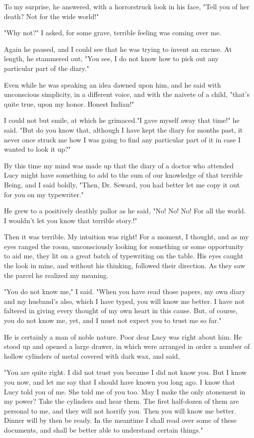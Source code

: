 To my surprise, he answered, with a horrorstruck look in his face, "Tell you of her death? Not for the wide world!" 

"Why not?" I asked, for some grave, terrible feeling was coming over me. 

Again he paused, and I could see that he was trying to invent an excuse. At length, he stammered out, "You see, I do not know how to pick out any particular part of the diary." 

Even while he was speaking an idea dawned upon him, and he said with unconscious simplicity, in a different voice, and with the naivete of a child, "that's quite true, upon my honor. Honest Indian!" 

I could not but smile, at which he grimaced."I gave myself away that time!" he said. "But do you know that, although I have kept the diary for months past, it never once struck me how I was going to find any particular part of it in case I wanted to look it up?" 

By this time my mind was made up that the diary of a doctor who attended Lucy might have something to add to the sum of our knowledge of that terrible Being, and I said boldly, "Then, Dr. Seward, you had better let me copy it out for you on my typewriter." 

He grew to a positively deathly pallor as he said, "No! No! No! For all the world. I wouldn't let you know that terrible story.!" 

Then it was terrible. My intuition was right! For a moment, I thought, and as my eyes ranged the room, unconsciously looking for something or some opportunity to aid me, they lit on a great batch of typewriting on the table. His eyes caught the look in mine, and without his thinking, followed their direction. As they saw the parcel he realized my meaning. 

"You do not know me," I said. "When you have read those papers, my own diary and my husband's also, which I have typed, you will know me better. I have not faltered in giving every thought of my own heart in this cause. But, of course, you do not know me, yet, and I must not expect you to trust me so far." 

He is certainly a man of noble nature. Poor dear Lucy was right about him. He stood up and opened a large drawer, in which were arranged in order a number of hollow cylinders of metal covered with dark wax, and said, 

"You are quite right. I did not trust you because I did not know you. But I know you now, and let me say that I should have known you long ago. I know that Lucy told you of me. She told me of you too. May I make the only atonement in my power? Take the cylinders and hear them. The first half-dozen of them are personal to me, and they will not horrify you. Then you will know me better. Dinner will by then be ready. In the meantime I shall read over some of these documents, and shall be better able to understand certain things." 

